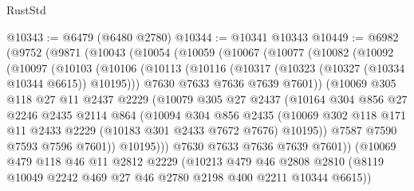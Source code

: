 \begin{lexlean}{RustStd}
\begin{coremodule}
{\begin{coremodule}
{{{{{{{{{{{{{{{{{{{{{{{{{{@10343 := @6479 (@6480 @2780)
@10344 := @10341 @10343
@10449 := @6982
    (@9752
      (@9871
        (@10043
          (@10054
            (@10059
              (@10067
                (@10077
                  (@10082
                    (@10092
                      (@10097
                        (@10103
                          (@10106
                            (@10113
                              (@10116 (@10317 (@10323 (@10327 (@10334 @10344 @6615)) @10195)))
                              @7630
                              @7633
                              @7636
                              @7639
                              @7601))
                          (@10069
                            @305
                            @118
                            @27
                            @11
                            @2437
                            @2229
                            (@10079
                              @305
                              @27
                              @2437
                              (@10164
                                @304
                                @856
                                @27
                                @2246
                                @2435
                                @2114
                                @864
                                (@10094
                                  @304
                                  @856
                                  @2435
                                  (@10069
                                    @302
                                    @118
                                    @171
                                    @11
                                    @2433
                                    @2229
                                    (@10183 @301 @2433 @7672 @7676)
                                    @10195))
                                @7587
                                @7590
                                @7593
                                @7596
                                @7601))
                            @10195)))
                      @7630
                      @7633
                      @7636
                      @7639
                      @7601))
                  (@10069
                    @479
                    @118
                    @46
                    @11
                    @2812
                    @2229
                    (@10213
                      @479
                      @46
                      @2808
                      @2810
                      (@8119 @10049 @2242 @469 @27 @46 @2780 @2198 @400 @2211 @10344 @6615))
}}}}}}}}}}}}}}}}}}}}}}}}}}
\end{coremodule}}
\end{coremodule}
\end{lexlean}
